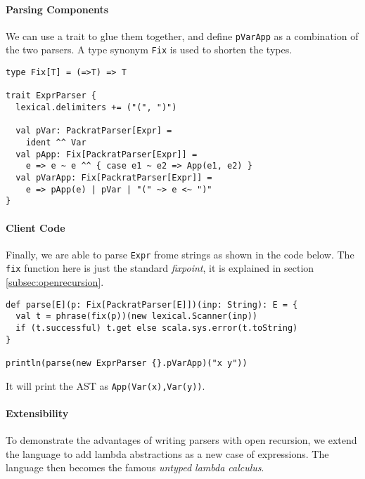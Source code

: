 \paragraph{Parsing Components}
We can use a trait to glue them together, and define
\lstinline{pVarApp} as a combination of the two parsers. A type
synonym \lstinline{Fix} is used to shorten the types.

\begin{lstlisting}
type Fix[T] = (=>T) => T

trait ExprParser {
  lexical.delimiters += ("(", ")")

  val pVar: PackratParser[Expr] =
    ident ^^ Var
  val pApp: Fix[PackratParser[Expr]] =
    e => e ~ e ^^ { case e1 ~ e2 => App(e1, e2) }
  val pVarApp: Fix[PackratParser[Expr]] =
    e => pApp(e) | pVar | "(" ~> e <~ ")"
}
\end{lstlisting}

\paragraph{Client Code}
Finally, we are able to parse \lstinline{Expr} frome strings as shown in the code below. The \lstinline{fix} function here is just the standard \textit{fixpoint}, it is explained in section \ref{subsec:openrecursion}.

\begin{lstlisting}
def parse[E](p: Fix[PackratParser[E]])(inp: String): E = {
  val t = phrase(fix(p))(new lexical.Scanner(inp))
  if (t.successful) t.get else scala.sys.error(t.toString)
}

println(parse(new ExprParser {}.pVarApp)("x y"))
\end{lstlisting}

It will print the AST as \lstinline{App(Var(x),Var(y))}.


\paragraph{Extensibility} To demonstrate the advantages of writing 
parsers with open recursion, we extend the language to add lambda 
abstractions as a new case of expressions. The language then 
becomes the famous \textit{untyped lambda calculus}.


